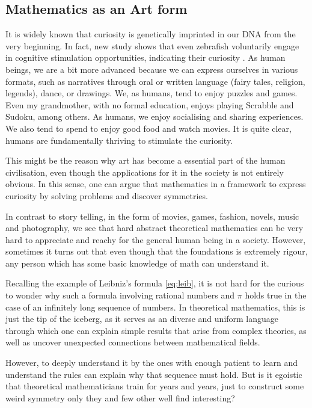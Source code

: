 \documentclass[10pt,twocolumn]{article}
\begin{document}
\begin{sloppy}


\newpage
\section*{Mathematics as an Art form}%
\label{sec:mathematics_for_stimulating_intellectual_mind}


It is widely known that curiosity is genetically imprinted in our DNA from the very beginning.
In fact, new study shows that even zebrafish voluntarily engage in cognitive stimulation opportunities, indicating their curiosity \cite{franks2023curiosity}.
As human beings, we are a bit more advanced because we can express ourselves in various formats, such as narratives through oral or written language (fairy tales, religion, legends), dance, or drawings. We, as humans, tend to enjoy puzzles and games.
Even my grandmother, with no formal education, enjoys playing Scrabble and Sudoku, among others.
As humans, we enjoy socialising and sharing experiences. We also tend to spend to enjoy good food and watch movies. It is quite clear, humans are fundamentally thriving to stimulate the curiosity.

This might be the reason why art has become a essential part of the human civilisation, even though the applications for it in the society is not entirely obvious.
In this sense, one can argue that mathematics in a framework to express curiosity by
solving problems and discover symmetries.

In contrast to story telling, in the form of movies, games, fashion, novels, music and photography, we see that hard abstract theoretical mathematics can be very hard to appreciate and reachy for the general human being in a society. However,
sometimes it turns out that even though that the foundations is extremely rigour, any person which has some basic knowledge of math can understand it.

Recalling the example of Leibniz's formula \eqref{eq:leib}, it is not hard for the curious to wonder why such a formula involving rational numbers and $\pi$ holds true in the case of an infinitely long sequence of numbers. In theoretical mathematics,
this is just the tip of the iceberg, as it serves as an diverse and uniform language through which one can explain simple results that arise from complex theories, as well as uncover unexpected connections between mathematical fields.

However, to deeply understand it by the ones with enough patient to learn and understand the rules can explain why that sequence must hold.
     But is it egoistic that theoretical mathematicians train for years and years, just to construct some weird symmetry only they and few other well find interesting?


\end{sloppy}
\end{document}
